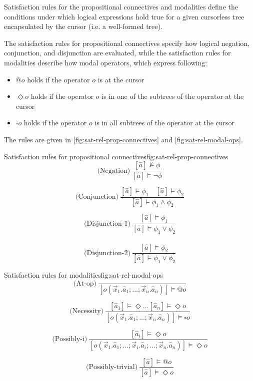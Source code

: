 Satisfaction rules for the propositional connectives and modalities define the conditions under which logical expressions hold true for a given
cursorless tree encapsulated by the cursor (i.e. a well-formed tree).

The satisfaction rules for propositional connectives specify how logical negation, conjunction, and disjunction are evaluated, while the satisfaction rules for modalities describe how modal operators, which express following:

\begin{itemize}
    \item $@o$ holds if the operator $o$ is at the cursor
    \item $\Diamond o$ holds if the operator $o$ is in one of the subtrees of the operator at the cursor
    \item $\square o$ holds if the operator $o$ is in all subtrees of the operator at the cursor
\end{itemize}

The rules are given in \cref{fig:sat-rel-prop-connectives} and \cref{fig:sat-rel-modal-ops}.

\begin{myfigure}{Satisfaction rules for propositional connectives}{fig:sat-rel-prop-connectives}
    \[
        \text{(Negation)} \ \frac{[\hat{a}] \not\models \phi}{[\hat{a}] \models \neg \phi}
    \]

    \[
        \text{(Conjunction)} \ \frac{[\hat{a}] \models \phi_1 \quad [\hat{a}] \models \phi_2}{[\hat{a}] \models \phi_1 \land \phi_2}
    \]

    \[
        \text{(Disjunction-1)} \ \frac{[\hat{a}] \models \phi_1}{[\hat{a}] \models \phi_1 \lor \phi_2}
    \]
    \\
    \[
        \text{(Disjunction-2)} \ \frac{[\hat{a}] \models \phi_2}{[\hat{a}] \models \phi_1 \lor \phi_2}
    \]
\end{myfigure}

\begin{myfigure}{Satisfaction rules for modalities}{fig:sat-rel-modal-ops}
    \[
        \text{(At-op)} \ \frac{}{[o(\vec{x}_1.\hat{a}_1;...;\vec{x}_n.\hat{a}_n)] \models @o}
    \]

    \[
        \text{(Necessity)} \ \frac{[\hat{a}_1] \models \Diamond ... [\hat{a}_n] \models \Diamond o}{[o(\vec{x}_1.\hat{a}_1;...;\vec{x}_n.\hat{a}_n)] \models \square o}
    \]

    \[
        \text{(Possibly-i)} \ \frac{[\hat{a}_i] \models \Diamond o}{[o(\vec{x}_1.\hat{a}_1;...;\Vec{x}_i.\hat{a}_i;...;\vec{x}_n.\hat{a}_n)] \models \Diamond o}
    \]

    \[
        \text{(Possibly-trivial)} \ \frac{[\hat{a}] \models @o}{[\hat{a}] \models \Diamond o}
    \]
\end{myfigure}

